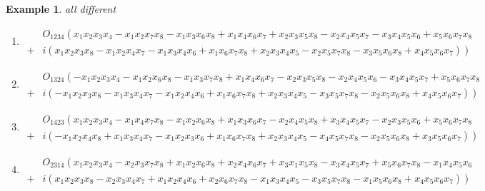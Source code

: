 \documentclass[aps,preprint]{revtex4}%
\newtheorem{example}[theorem]{Example}
\begin{document}
\begin{example}
all different

\begin{enumerate}
\item
\begin{align}
&  O_{1234}\left(  \overset{}{x_{1}x_{2}x_{3}x_{4}-x_{1}x_{2}x_{7}x_{8}%
-x_{1}x_{3}x_{6}x_{8}+x_{1}x_{4}x_{6}x_{7}+x_{2}x_{3}x_{5}x_{8}-x_{2}%
x_{4}x_{5}x_{7}-x_{3}x_{4}x_{5}x_{6}+x_{5}x_{6}x_{7}x_{8}}\right. \\
+  &  \left.  i\left(  \overset{}{x_{1}x_{2}x_{3}x_{8}-x_{1}x_{2}x_{4}%
x_{7}-x_{1}x_{3}x_{4}x_{6}+x_{1}x_{6}x_{7}x_{8}+x_{2}x_{3}x_{4}x_{5}%
-x_{2}x_{5}x_{7}x_{8}-x_{3}x_{5}x_{6}x_{8}+x_{4}x_{5}x_{6}x_{7}}\right)
\right)
\end{align}


\item
\begin{align}
&  O_{1324}\left(  \overset{}{-x_{1}x_{2}x_{3}x_{4}-x_{1}x_{2}x_{6}x_{8}%
-x_{1}x_{3}x_{7}x_{8}+x_{1}x_{4}x_{6}x_{7}-x_{2}x_{3}x_{5}x_{8}-x_{2}%
x_{4}x_{5}x_{6}-x_{3}x_{4}x_{5}x_{7}+x_{5}x_{6}x_{7}x_{8}}\right. \\
+  &  \left.  i\left(  -\overset{}{x_{1}x_{2}x_{3}x_{8}-x_{1}x_{3}x_{4}%
x_{7}-x_{1}x_{2}x_{4}x_{6}+x_{1}x_{6}x_{7}x_{8}+x_{2}x_{3}x_{4}x_{5}%
-x_{3}x_{5}x_{7}x_{8}-x_{2}x_{5}x_{6}x_{8}+x_{4}x_{5}x_{6}x_{7}}\right)
\right)
\end{align}


\item
\begin{align}
&  O_{1423}\left(  \overset{}{x_{1}x_{2}x_{3}x_{4}-x_{1}x_{4}x_{7}x_{8}%
-x_{1}x_{2}x_{6}x_{8}+x_{1}x_{3}x_{6}x_{7}-x_{2}x_{4}x_{5}x_{8}+x_{3}%
x_{4}x_{5}x_{7}-x_{2}x_{3}x_{5}x_{6}+x_{5}x_{6}x_{7}x_{8}}\right. \\
+  &  \left.  i\left(  \overset{}{-x_{1}x_{2}x_{4}x_{8}+x_{1}x_{3}x_{4}%
x_{7}-x_{1}x_{2}x_{3}x_{6}+x_{1}x_{6}x_{7}x_{8}+x_{2}x_{3}x_{4}x_{5}%
-x_{4}x_{5}x_{7}x_{8}-x_{2}x_{5}x_{6}x_{8}+x_{3}x_{5}x_{6}x_{7}}\right)
\right)
\end{align}


\item
\begin{align}
&  O_{2314}\left(  \overset{}{x_{1}x_{2}x_{3}x_{4}-x_{2}x_{3}x_{7}x_{8}%
+x_{1}x_{2}x_{6}x_{8}+x_{2}x_{4}x_{6}x_{7}+x_{3}x_{1}x_{5}x_{8}-x_{3}%
x_{4}x_{5}x_{7}+x_{5}x_{6}x_{7}x_{8}-x_{1}x_{4}x_{5}x_{6}}\right. \\
+  &  \left.  i\left(  \overset{}{x_{1}x_{2}x_{3}x_{8}-x_{2}x_{3}x_{4}%
x_{7}+x_{1}x_{2}x_{4}x_{6}+x_{2}x_{6}x_{7}x_{8}-x_{1}x_{3}x_{4}x_{5}%
-x_{3}x_{5}x_{7}x_{8}-x_{1}x_{5}x_{6}x_{8}+x_{4}x_{5}x_{6}x_{7}}\right)
\right)
\end{align}



\end{enumerate}
\end{example}
\end{document}
